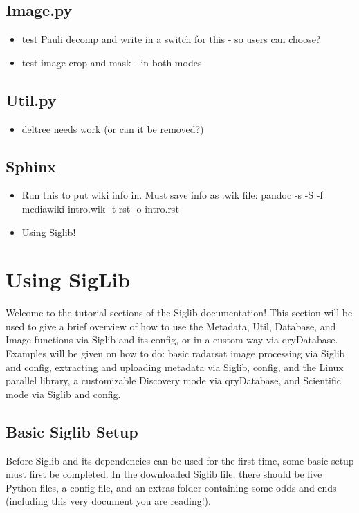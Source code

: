 \documentclass[letterpaper,10pt,openany,oneside]{sphinxmanual}
\begin{document}
\section{Image.py}
\label{project:image-py}\begin{itemize}
\item {} 
test Pauli decomp and write in a switch for this - so users can
choose?

\item {} 
test image crop and mask - in both modes

\end{itemize}


\section{Util.py}
\label{project:util-py}\begin{itemize}
\item {} 
deltree needs work (or can it be removed?)

\end{itemize}


\section{Sphinx}
\label{project:sphinx}\begin{itemize}
\item {} 
Run this to put wiki info in. Must save info as .wik file: pandoc -s
-S -f mediawiki intro.wik -t rst -o intro.rst

\item {} 
Using Siglib!

\end{itemize}


\chapter{Using SigLib}
\label{tutorial::doc}\label{tutorial:using-siglib}
Welcome to the tutorial sections of the Siglib documentation! This section
will be used to give a brief overview of how to use the Metadata,
Util, Database, and Image functions via Siglib and its config,
or in a custom way via qryDatabase. Examples will be given on how to do:
basic radarsat image processing via Siglib and config, extracting and uploading
metadata via Siglib, config, and the Linux parallel library, a customizable
Discovery mode via qryDatabase, and Scientific mode via Siglib and config.


\section{Basic Siglib Setup}
\label{tutorial:basic-siglib-setup}
Before Siglib and its dependencies can be used for the first time, some
basic setup must first be completed. In the downloaded Siglib file, there
should be five Python files, a config file, and an extras folder
containing some odds and ends (including this very document you are reading!).
\end{document}
